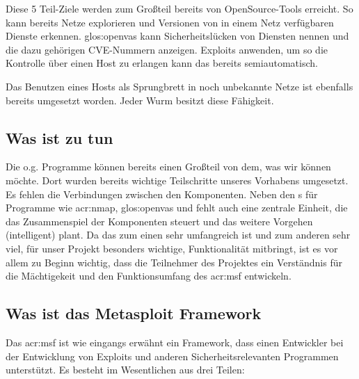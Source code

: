 Diese 5 Teil-Ziele werden zum Großteil bereits von OpenSource-Tools
erreicht.
So kann  bereits Netze explorieren und Versionen
von in einem Netz verfügbaren Dienste erkennen. \gls{glos:openvas}
kann Sicherheitslücken von Diensten nennen und die dazu gehörigen
CVE-Nummern anzeigen.
Exploits anwenden, um so die Kontrolle über einen Host zu erlangen
kann das  bereits semiautomatisch.

Das Benutzen eines Hosts als Sprungbrett in noch unbekannte Netze ist
ebenfalls bereits umgesetzt worden. Jeder Wurm besitzt diese
Fähigkeit.

\subsection{Was ist zu tun}

Die o.g. Programme können bereits einen Großteil von dem, was wir
können möchte. Dort wurden bereits wichtige Teilschritte unseres
Vorhabens umgesetzt. Es fehlen die Verbindungen zwischen den
Komponenten. Neben den s für Programme wie
\gls{acr:nmap}, \gls{glos:openvas} und  fehlt auch eine
zentrale Einheit, die das Zusammenspiel der Komponenten steuert und
das weitere Vorgehen (intelligent) plant.
Da das  zum einen sehr umfangreich ist und zum anderen
sehr viel, für unser Projekt besonders wichtige, Funktionalität
mitbringt, ist es vor allem zu Beginn wichtig, dass die Teilnehmer des
Projektes ein Verständnis für die Mächtigekeit und den Funktionsumfang
des \gls{acr:msf} entwickeln. 

\subsection{Was ist das Metasploit Framework}

Das \gls{acr:msf} ist wie eingangs erwähnt ein Framework, dass einen
Entwickler bei der Entwicklung von Exploits und anderen
Sicherheitsrelevanten Programmen unterstützt. Es besteht im
Wesentlichen aus drei Teilen:

